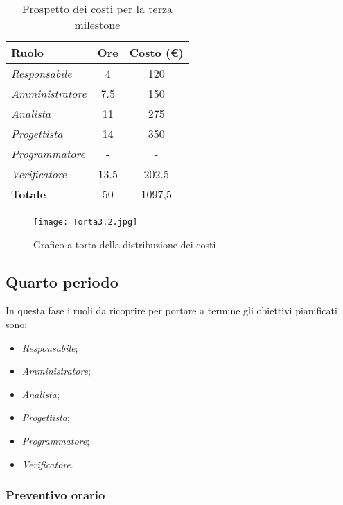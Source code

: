 \begin{table}[H]
    \centering
    \begin{tabular}{|l|c|c|}
    \hline
    \textbf{Ruolo} & \multicolumn{1}{l|}{\textbf{Ore}} & \multicolumn{1}{l|}{\textbf{Costo (€)}} \\ \hline
    \textit{Responsabile}   & 4    & 120   \\ \hline
    \textit{Amministratore} & 7.5  & 150   \\ \hline
    \textit{Analista}       & 11   & 275   \\ \hline
    \textit{Progettista}    & 14   & 350   \\ \hline
    \textit{Programmatore}  & -    & -     \\ \hline
    \textit{Verificatore}   & 13.5 & 202.5 \\ \hline
    \textbf{Totale}         & 50   & 1097,5\\ \hline
    \end{tabular}
    \caption{Prospetto dei costi per la terza milestone}
\end{table}

\begin{figure}[H]
    \texttt{[image: Torta3.2.jpg]}
    \caption{Grafico a torta della distribuzione dei costi}
\end{figure}



\newpage
\subsection{Quarto periodo}

In questa fase i ruoli da ricoprire per portare a termine gli obiettivi pianificati sono:
\begin{itemize}
    \item \textit{Responsabile};
    \item \textit{Amministratore};
    \item \textit{Analista};
    \item \textit{Progettista};
    \item \textit{Programmatore};
    \item \textit{Verificatore}.
\end{itemize}

\subsubsection{Preventivo orario}

